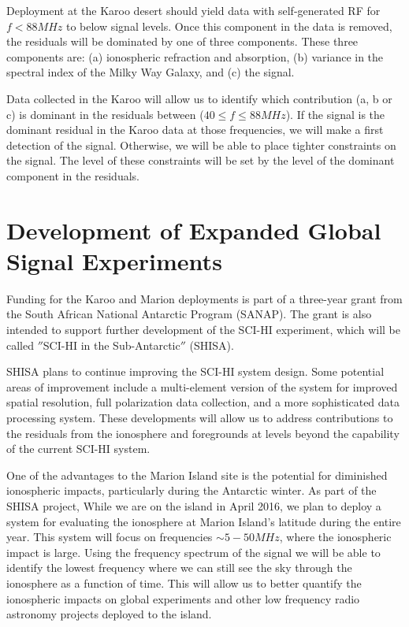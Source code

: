Deployment at the Karoo desert should yield data with self-generated RF for $f<88 MHz$ to below \cm signal levels. Once this component in the data is removed, the residuals will be dominated by one of three components. These three components are: (a) ionospheric refraction and absorption, (b) variance in the spectral index of the Milky Way Galaxy, and (c) the \cm signal. 

Data collected in the Karoo will allow us to identify which contribution (a, b or c) is dominant in the residuals between ($40\leq f \leq 88 MHz$). If the \cm signal is the dominant residual in the Karoo data at those frequencies, we will make a first detection of the \cm signal. Otherwise, we will be able to place tighter constraints on the \cm signal. The level of these constraints will be set by the level of the dominant component in the residuals. 

\section{Development of Expanded Global \cm Signal Experiments}

Funding for the Karoo and Marion deployments is part of a three-year grant from the South African National Antarctic Program (SANAP). The grant is also intended to support further development of the SCI-HI experiment, which will be called $''$SCI-HI in the Sub-Antarctic$''$ (SHISA). 

SHISA plans to continue improving the SCI-HI system design. Some potential areas of improvement include a multi-element version of the system for improved spatial resolution, full polarization data collection, and a more sophisticated data processing system. These developments will allow us to address contributions to the residuals from the ionosphere and foregrounds at levels beyond the capability of the current SCI-HI system.

One of the advantages to the Marion Island site is the potential for diminished ionospheric impacts, particularly during the Antarctic winter. As part of the SHISA project, While we are on the island in April 2016, we plan to deploy a system for evaluating the ionosphere at Marion Island's latitude during the entire year. This system will focus on frequencies $\sim5-50 MHz$, where the ionospheric impact is large. Using the frequency spectrum of the signal we will be able to identify the lowest frequency where we can still see the sky through the ionosphere as a function of time. This will allow us to better quantify the ionospheric impacts on global \cm experiments and other low frequency radio astronomy projects deployed to the island. 